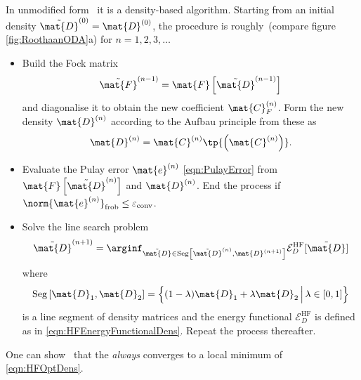 In unmodified form~\cite{Cances2000,Cances2000a} it is a density-based \SCF algorithm.
Starting from an initial density $\tilde{\mat{D}}^{(0)} = \mat{D}^{(0)}$,
the procedure is roughly~(compare figure \ref{fig:RoothaanODA}a)
for $n=1, 2, 3, \ldots$
\begin{itemize}
	\item Build the Fock matrix
	\begin{equation}
	\tilde{\mat{F}}^{(n-1)} = \mat{F}\left[ \tilde{\mat{D}}^{(n-1)} \right]
		\label{eqn:ODAupFock}
	\end{equation}
	and diagonalise it to obtain the new coefficient $\mat{C}_F^{(n)}$.
	Form the new density $\mat{D}^{(n)}$ according to the Aufbau principle from these
	as
	\[ \mat{D}^{(n)} = \mat{C}^{(n)} \tp{\left( \mat{C}^{(n)} \right)}. \]
	\item Evaluate the Pulay error $\mat{e}^{(n)}$ \eqref{eqn:PulayError}
		from $\mat{F}\left[ \tilde{\mat{D}}^{(n)} \right]$
		and $\mat{D}^{(n)}$.
		End the process if $\norm{\mat{e}^{(n)}}_\text{frob} \leq \epsilonconv$.
	\item Solve the line search problem
		\begin{equation}
			\tilde{\mat{D}}^{(n+1)}
			= \arginf_{\tilde{\mat{D}} \in
			\text{Seg}\left[\tilde{\mat{D}}^{(n)}, \mat{D}^{(n+1)}\right]}
			\mathcal{E}_D^\text{HF}[\tilde{\mat{D}}]
			\label{eqn:ODAupDens}
		\end{equation}
		where
		\[
			\text{Seg}\left[\mat{D}_1, \mat{D}_2\right]
				= \left\{ (1-\lambda) \mat{D}_1 + \lambda \mat{D}_2 \, \Big|\,
				\lambda \in [0,1] \right\}
		\]
		is a line segment of density matrices
		and the energy functional $\mathcal{E}_D^\text{HF}$
		is defined as in \eqref{eqn:HFEnergyFunctionalDens}.
		Repeat the process thereafter.
\end{itemize}
One can show~\cite{Cances2000} that the \ODA
\emph{always} converges to a local minimum of \eqref{eqn:HFOptDens}.

